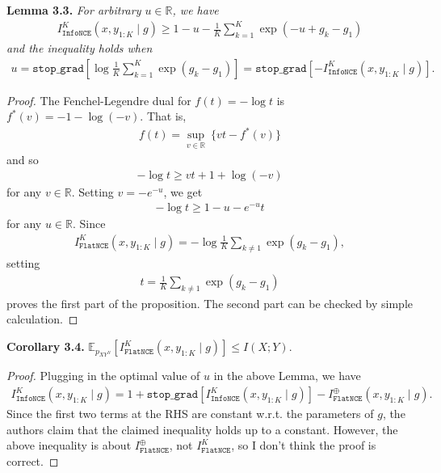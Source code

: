\documentclass[10pt]{article}
\newcommand{\RR}{\mathbb{R}}
\newcommand{\EE}{\mathbb{E}}
\newcommand{\infonce}{\texttt{InfoNCE}}
\newcommand{\flatnce}{\texttt{FlatNCE}}
\newcommand{\stopg}{\texttt{stop\char`_grad}}
\begin{document}
\textbf{Lemma 3.3.} \textit{For arbitrary $u \in \RR$, we have}
\begin{align*}
I^K_\infonce(x,y_{1:K} \mid g) \geq 1 - u - \frac{1}{K} \sum_{k = 1}^K \exp(-u + g_k - g_1)
\end{align*}
\textit{and the inequality holds when}
\begin{align*}
u = \stopg \left[ \log \frac{1}{K} \sum_{k = 1}^K \exp(g_k - g_1) \right] = \stopg \left[ -I^K_\infonce(x,y_{1:K} \mid g) \right].
\end{align*}
\begin{proof}
The Fenchel-Legendre dual for $f(t) = - \log t$ is $f^*(v) = -1 - \log(-v)$. That is,
\begin{align*}
f(t) = \sup_{v \in \RR} \ \{vt - f^*(v)\}
\end{align*}
and so
\begin{align*}
- \log t \geq vt + 1 + \log(-v)
\end{align*}
for any $v \in \RR$. Setting $v = -e^{-u}$, we get
\begin{align*}
- \log t \geq 1 - u - e^{-u} t
\end{align*}
for any $u \in \RR$. Since
\begin{align*}
I^K_\flatnce(x,y_{1:K} \mid g) = - \log \frac{1}{K} \sum_{k \neq 1} \exp(g_k - g_1),
\end{align*}
setting
\begin{align*}
t = \frac{1}{K} \sum_{k \neq 1} \exp(g_k - g_1)
\end{align*}
proves the first part of the proposition. The second part can be checked by simple calculation.
\end{proof}

\textbf{Corollary 3.4.} $\EE_{p_{XY^N}} \left[ I^K_\flatnce(x,y_{1:K} \mid g) \right] \leq I(X;Y)$.
\begin{proof}
Plugging in the optimal value of $u$ in the above Lemma, we have
\begin{align*}
I^K_\infonce(x,y_{1:K} \mid g) = 1 + \stopg \left[ I^K_\infonce(x,y_{1:K} \mid g) \right] - I^\oplus_\flatnce(x,y_{1:K} \mid g).
\end{align*}
Since the first two terms at the RHS are constant w.r.t. the parameters of $g$, the authors claim that the claimed inequality holds up to a constant. However, the above inequality is about $I^\oplus_\flatnce$, not $I^K_\flatnce$, so I don't think the proof is correct.
\end{proof}
\end{document}
